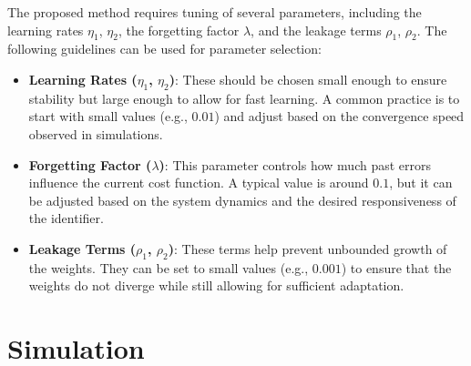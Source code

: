 \documentclass[10pt,twocolumn]{ICCAS}
\begin{document}
The proposed method requires tuning of several parameters, including the learning rates $\eta_1$, $\eta_2$, the forgetting factor $\lambda$, and the leakage terms $\rho_1$, $\rho_2$. The following guidelines can be used for parameter selection:
\begin{itemize}
    \item \textbf{Learning Rates ($\eta_1$, $\eta_2$)}: These should be chosen small enough to ensure stability but large enough to allow for fast learning. A common practice is to start with small values (e.g., $0.01$) and adjust based on the convergence speed observed in simulations.
    \item \textbf{Forgetting Factor ($\lambda$)}: This parameter controls how much past errors influence the current cost function. A typical value is around $0.1$, but it can be adjusted based on the system dynamics and the desired responsiveness of the identifier.
    \item \textbf{Leakage Terms ($\rho_1$, $\rho_2$)}: These terms help prevent unbounded growth of the weights. They can be set to small values (e.g., $0.001$) to ensure that the weights do not diverge while still allowing for sufficient adaptation.
\end{itemize}
\noindent

\section{Simulation}
\end{document}
